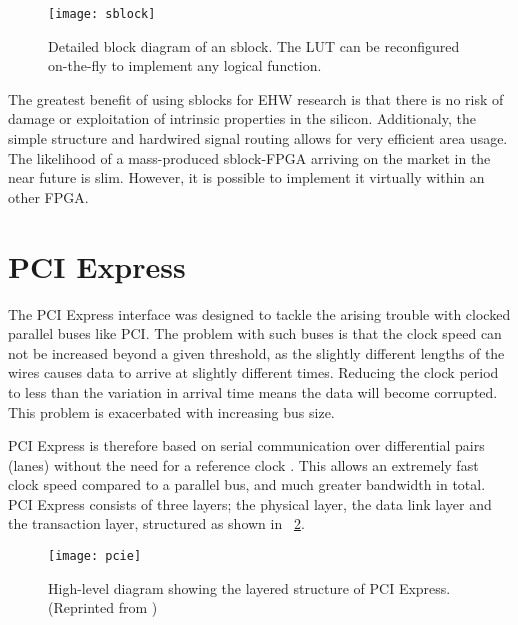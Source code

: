 \begin{figure}[!ht]
    \centering
    \texttt{[image: sblock]}
    \caption[Sblock]{
        Detailed block diagram of an sblock.
        The LUT can be reconfigured on-the-fly to implement any logical function.
    }
    \label{fig:sblock}
\end{figure}

The greatest benefit of using sblocks for EHW research is that there is no risk of damage or exploitation of intrinsic properties in the silicon.
Additionaly, the simple structure and hardwired signal routing allows for very efficient area usage.
The likelihood of a mass-produced sblock-FPGA arriving on the market in the near future is slim.
However, it is possible to implement it virtually within an other FPGA.


\section{PCI Express}

The PCI Express interface was designed to tackle the arising trouble with clocked parallel buses like PCI.
The problem with such buses is that the clock speed can not be increased beyond a given threshold, as the slightly different lengths of the wires causes data to arrive at slightly different times.
Reducing the clock period to less than the variation in arrival time means the data will become corrupted.
This problem is exacerbated with increasing bus size.

PCI Express is therefore based on serial communication over differential pairs (lanes\footnotemark) without the need for a reference clock \cite{pcie}.
This allows an extremely fast clock speed compared to a parallel bus, and much greater bandwidth in total.
PCI Express consists of three layers; the physical layer, the data link layer and the transaction layer, structured as shown in \figurename~\ref{fig:pcie}.

\begin{figure}[!ht]
    \centering
    \texttt{[image: pcie]}
    \caption[PCI Express structure]{
        High-level diagram showing the layered structure of PCI Express. (Reprinted from \cite{pcie})
    }
    \label{fig:pcie}
\end{figure}

